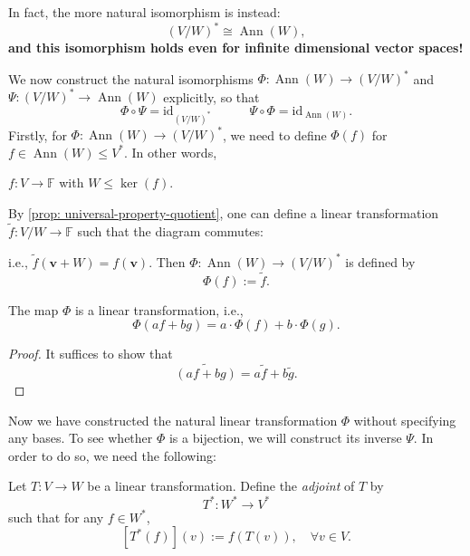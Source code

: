 In fact, the more natural isomorphism is instead:
  \[
  (V/W)^* \cong \operatorname{Ann}(W),
  \]
{\bf and this isomorphism holds even for infinite dimensional vector spaces!}

\medskip
We now construct the natural isomorphisms $\Phi: \operatorname{Ann}(W) \to (V/W)^*$ and 
$\Psi: (V/W)^* \to \operatorname{Ann}(W)$
explicitly, so that 
$$\Phi \circ \Psi = \mathrm{id}_{(V/W)^*} \quad \quad \quad \Psi \circ \Phi = \mathrm{id}_{\operatorname{Ann}(W)}.$$
Firstly, for $\Phi: \operatorname{Ann}(W) \to (V/W)^*$, we need to define $\Phi(f)$
for $f \in \operatorname{Ann}(W) \leq V^*$. In other words, 
\begin{center}
$f: V \to \mathbb{F}$ with $W \leq \ker(f)$. 
\end{center}
By \autoref{prop: universal-property-quotient}, one can define a linear transformation \(\widetilde{f} : V/W \to \mathbb{F}\) such that the diagram commutes:

\begin{figure}[h!]
\centering
{}
\end{figure}

i.e., \(\widetilde{f}(\mathbf{v} + W) = f(\mathbf{v})\). Then \(\Phi:\operatorname{Ann}(W) \to (V/W)^*\) is defined by
   \[\Phi(f) := \widetilde{f}.\]

\begin{proposition}
The map \( \Phi \) is a linear transformation, i.e.,
\[
\Phi(af + bg) = a \cdot \Phi(f) + b \cdot \Phi(g).
\]
\end{proposition}

\begin{proof}
It suffices to show that
\[
\widetilde{(af + bg)} = a\widetilde{f} + b\widetilde{g}.
\]
\end{proof}

Now we have constructed the natural linear transformation $\Phi$ without specifying any bases. To see whether \( \Phi \) is a bijection, we will construct its inverse \( \Psi \). In order to do so, we need the following:
\begin{definition}\label{def:adjoint-map}
Let \( T : V \to W \) be a linear transformation. Define the \emph{adjoint} of \( T \) by
\[
T^* : W^* \to V^*
\]
such that for any \( f \in W^* \),
\[
[T^*(f)](v) := f(T(v)), \quad \forall v \in V.
\]
\end{definition}

